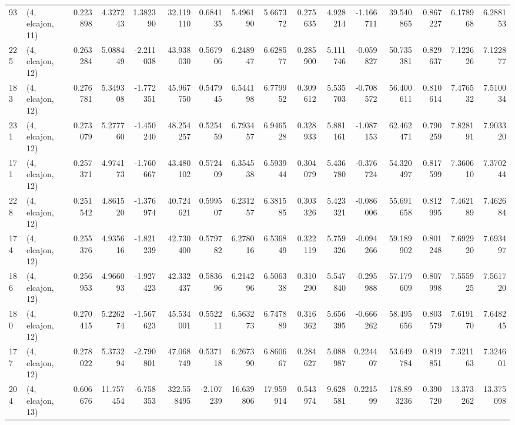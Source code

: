 \begin{tabular}{llrrrrrrrrrrrrrr}
93  &  (4, elcajon, 11) &   0.223898 &   4.327243 &  1.382390 &   32.119110 &  0.684135 &   5.496190 &   5.667372 &  0.275635 &   4.928214 &  -1.166711 &   39.540865 &  0.867227 &   6.178968 &   6.288153 \\
225 &  (4, elcajon, 12) &   0.263284 &   5.088449 & -2.211038 &   43.938030 &  0.567906 &   6.248947 &   6.628577 &  0.285900 &   5.111746 &  -0.059827 &   50.735381 &  0.829637 &   7.122626 &   7.122877 \\
183 &  (4, elcajon, 12) &   0.276781 &   5.349308 & -1.772351 &   45.967750 &  0.547945 &   6.544198 &   6.779952 &  0.309612 &   5.535703 &  -0.708572 &   56.400611 &  0.810614 &   7.476532 &   7.510034 \\
231 &  (4, elcajon, 12) &   0.273079 &   5.277760 & -1.450240 &   48.254257 &  0.525459 &   6.793457 &   6.946528 &  0.328933 &   5.881161 &  -1.087153 &   62.462471 &  0.790259 &   7.828191 &   7.903320 \\
171 &  (4, elcajon, 12) &   0.257371 &   4.974173 & -1.760667 &   43.480102 &  0.572409 &   6.354538 &   6.593944 &  0.304079 &   5.436780 &  -0.376724 &   54.320497 &  0.817599 &   7.360610 &   7.370244 \\
228 &  (4, elcajon, 12) &   0.251542 &   4.861520 & -1.376974 &   40.724621 &  0.599507 &   6.231257 &   6.381585 &  0.303326 &   5.423321 &  -0.086006 &   55.691658 &  0.812995 &   7.462189 &   7.462684 \\
174 &  (4, elcajon, 12) &   0.255376 &   4.935616 & -1.821239 &   42.730400 &  0.579782 &   6.278016 &   6.536849 &  0.322119 &   5.759326 &  -0.094266 &   59.189902 &  0.801248 &   7.692920 &   7.693497 \\
186 &  (4, elcajon, 12) &   0.256953 &   4.966093 & -1.927423 &   42.332437 &  0.583696 &   6.214296 &   6.506338 &  0.310290 &   5.547840 &  -0.295988 &   57.179609 &  0.807998 &   7.555925 &   7.561720 \\
180 &  (4, elcajon, 12) &   0.270415 &   5.226274 & -1.567623 &   45.534001 &  0.552211 &   6.563273 &   6.747889 &  0.316362 &   5.656395 &  -0.666262 &   58.495656 &  0.803579 &   7.619170 &   7.648245 \\
177 &  (4, elcajon, 12) &   0.278022 &   5.373294 & -2.790801 &   47.068749 &  0.537118 &   6.267390 &   6.860667 &  0.284627 &   5.088987 &   0.224407 &   53.649784 &  0.819851 &   7.321163 &   7.324601 \\
204 &  (4, elcajon, 13) &   0.606676 &  11.757454 & -6.758353 &  322.558495 & -2.107239 &  16.639806 &  17.959914 &  0.543974 &   9.628581 &   0.221599 &  178.893236 &  0.390720 &  13.373262 &  13.375098 \\

\end{tabular}
